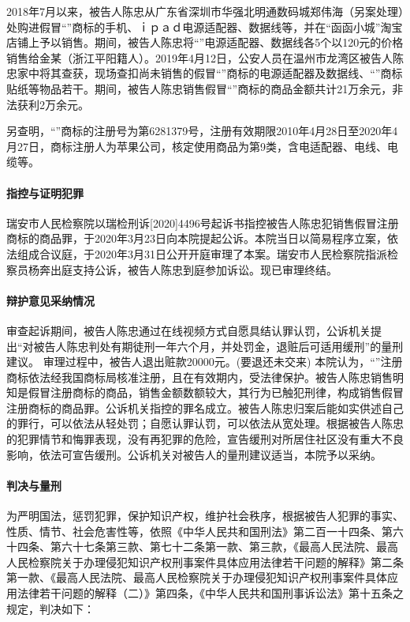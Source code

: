 \documentclass[
    a4paper
    ]{ctexart}
\begin{document}
{\begin{sloppy}
2018年7月以来，被告人陈忠从广东省深圳市华强北明通数码城郑伟海（另案处理）处购进假冒“”商标的手机、ｉｐａｄ电源适配器、数据线等，并在“函函小城”淘宝店铺上予以销售。期间，被告人陈忠将“”电源适配器、数据线各5个以120元的价格销售给金某（浙江平阳籍人）。2019年4月12日，公安人员在温州市龙湾区被告人陈忠家中将其查获，现场查扣尚未销售的假冒“”商标的电源适配器及数据线、“”商标贴纸等物品若干。期间，被告人陈忠销售假冒“”商标的商品金额共计21万余元，非法获利2万余元。 

另查明，“”商标的注册号为第6281379号，注册有效期限2010年4月28日至2020年4月27日，商标注册人为苹果公司，核定使用商品为第9类，含电适配器、电线、电缆等。


\paragraph{指控与证明犯罪}
瑞安市人民检察院以瑞检刑诉[2020]4496号起诉书指控被告人陈忠犯销售假冒注册商标的商品罪，于2020年3月23日向本院提起公诉。本院当日以简易程序立案，依法组成合议庭，于2020年3月31日公开开庭审理了本案。瑞安市人民检察院指派检察员杨奔出庭支持公诉，被告人陈忠到庭参加诉讼。现已审理终结。


\paragraph{辩护意见采纳情况}
审查起诉期间，被告人陈忠通过在线视频方式自愿具结认罪认罚，公诉机关提出“对被告人陈忠判处有期徒刑一年六个月，并处罚金，退赃后可适用缓刑”的量刑建议。
审理过程中，被告人退出赃款20000元。(要退还未交来)
本院认为，“”注册商标依法经我国商标局核准注册，且在有效期内，受法律保护。被告人陈忠销售明知是假冒注册商标的商品，销售金额数额较大，其行为已触犯刑律，构成销售假冒注册商标的商品罪。公诉机关指控的罪名成立。被告人陈忠归案后能如实供述自己的罪行，可以依法从轻处罚；自愿认罪认罚，可以依法从宽处理。根据被告人陈忠的犯罪情节和悔罪表现，没有再犯罪的危险，宣告缓刑对所居住社区没有重大不良影响，依法可宣告缓刑。公诉机关对被告人的量刑建议适当，本院予以采纳。


\paragraph{判决与量刑}
为严明国法，惩罚犯罪，保护知识产权，维护社会秩序，根据被告人犯罪的事实、性质、情节、社会危害性等，依照《中华人民共和国刑法》第二百一十四条、第六十四条、第六十七条第三款、第七十二条第一款、第三款，《最高人民法院、最高人民检察院关于办理侵犯知识产权刑事案件具体应用法律若干问题的解释》第二条第一款、《最高人民法院、最高人民检察院关于办理侵犯知识产权刑事案件具体应用法律若干问题的解释（二）》第四条，《中华人民共和国刑事诉讼法》第十五条之规定，判决如下：


\end{sloppy}}
\end{document}
